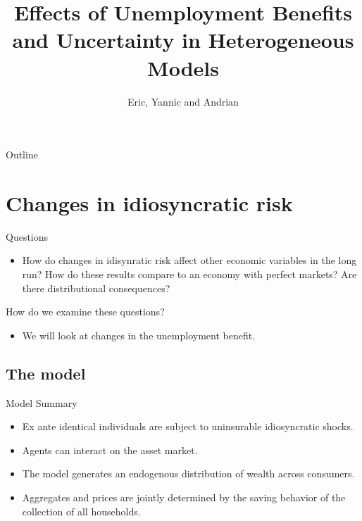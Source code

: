 \documentclass{beamer}
\title{Effects of Unemployment Benefits and Uncertainty in Heterogeneous Models}
\subtitle{}
\author{Eric, Yannic and Andrian}
\begin{document}
\begin{frame}
  \titlepage
\end{frame}

\begin{frame}{Outline}
  \tableofcontents
\end{frame}

\section{Changes in idiosyncratic risk}

\begin{frame}{Questions}
	\begin{itemize}
	
	\item {
How do changes in idisynratic risk affect other economic variables in the long run? How do these results compare to an economy with perfect markets? Are there distributional consequences?
	}
	
	\end{itemize}
\end{frame}

\begin{frame}{How do we examine these questions?}
	\begin{itemize}
	
	\item {
	We will look at changes in the unemployment benefit. 
	}
		
	\end{itemize}
\end{frame}

\subsection{The model}
\begin{frame}{Model Summary}
	\begin{itemize}
	
	\item {
	Ex ante identical individuals are subject to uninsurable idiosyncratic shocks. 
	}
	\item {
Agents can interact on the asset market.
	}
	\item {
The model generates an endogenous distribution of wealth across consumers. 
	}	
	\item {
Aggregates and prices are jointly determined by the saving behavior of the collection of all households. 
}

	\end{itemize}

\end{frame}
\end{document}
